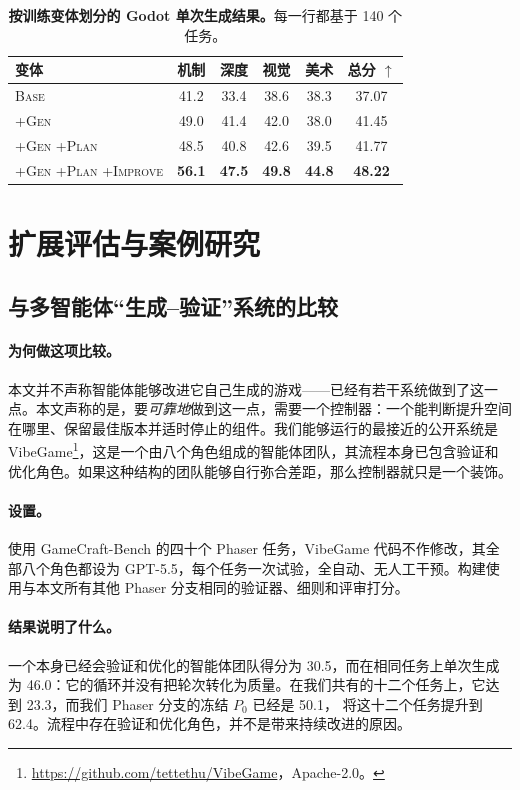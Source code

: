 \begin{table}[htbp]
\caption{\textbf{按训练变体划分的 Godot 单次生成结果。}每一行都基于 140 个任务。}
\label{tab:ablation}
\centering\small
\begin{tabular}{@{}lccccc@{}}
\toprule
变体 & 机制 & 深度 & 视觉 & 美术 & 总分 $\uparrow$ \\
\midrule
\textsc{Base} & 41.2 & 33.4 & 38.6 & 38.3 & 37.07 \\
\textsc{+Gen} & 49.0 & 41.4 & 42.0 & 38.0 & 41.45 \\
\textsc{+Gen +Plan} & 48.5 & 40.8 & 42.6 & 39.5 & 41.77 \\
\textsc{+Gen +Plan +Improve} & \textbf{56.1} & \textbf{47.5} & \textbf{49.8} & \textbf{44.8} & \textbf{48.22} \\
\bottomrule
\end{tabular}
\end{table}

\section{扩展评估与案例研究}\label{app:extended}
\subsection{与多智能体“生成–验证”系统的比较}\label{app:vibegame}
\paragraph{为何做这项比较。}本文并不声称智能体能够改进它自己生成的游戏——已经有若干系统做到了这一点。本文声称的是，要\emph{可靠地}做到这一点，需要一个控制器：一个能判断提升空间在哪里、保留最佳版本并适时停止的组件。我们能够运行的最接近的公开系统是 VibeGame\footnote{\url{https://github.com/tettethu/VibeGame}，Apache-2.0。}，这是一个由八个角色组成的智能体团队，其流程本身已包含验证和优化角色。如果这种结构的团队能够自行弥合差距，那么控制器就只是一个装饰。

\paragraph{设置。}使用 GameCraft-Bench 的四十个 Phaser 任务，VibeGame 代码不作修改，其全部八个角色都设为 GPT-5.5，每个任务一次试验，全自动、无人工干预。构建使用与本文所有其他 Phaser 分支相同的验证器、细则和评审打分。

\paragraph{结果说明了什么。}一个本身已经会验证和优化的智能体团队得分为 30.5，而在相同任务上单次生成为 46.0：它的循环并没有把轮次转化为质量。在我们共有的十二个任务上，它达到 23.3，而我们 Phaser 分支的冻结 $P_0$ 已经是 50.1，\rsig{} 将这十二个任务提升到 62.4。流程中存在验证和优化角色，并不是带来持续改进的原因。

